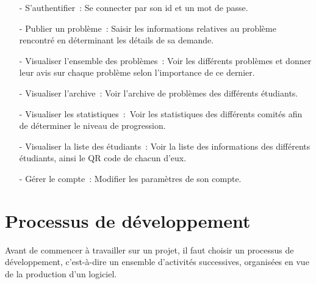 \documentclass[11.5pt]{report}
\begin{document}
\begin{itemize}
	\item[-] S’authentifier : Se connecter par son id et un mot de passe.
	\item[-] Publier un problème : Saisir les informations relatives au problème rencontré en déterminant les détails de sa demande.
	\item[-] Visualiser l’ensemble des problèmes : Voir les différents problèmes et donner leur avis sur chaque problème selon l’importance de ce dernier.
	\item[-] Visualiser l'archive : Voir l’archive de problèmes des différents étudiants.
	\item[-] Visualiser les statistiques : Voir les statistiques des différents comités afin de déterminer le niveau de progression.
	\item[-] Visualiser la liste des étudiants : Voir la liste des informations des différents étudiants, ainsi le QR code de chacun d’eux.
	\item[-] Gérer le compte : Modifier les paramètres de son compte.
	
\end{itemize}

\section{Processus de développement }
Avant de commencer à travailler sur un projet, il faut choisir un processus de développement, c’est-à-dire un ensemble d'activités successives, organisées en vue de la production d'un logiciel.
\end{document}
